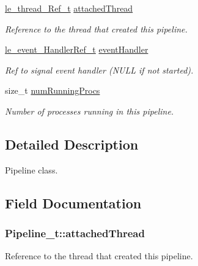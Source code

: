 \begin{DoxyCompactItemize}
\hyperlink{le__thread_8h_a32121104c6b4ca39008eb79a4d6862f2}{le\+\_\+thread\+\_\+\+Ref\+\_\+t} \hyperlink{struct_pipeline__t_a87fa47c4132391edce05712f2773c050}{attached\+Thread}
\begin{DoxyCompactList}\small\item\em Reference to the thread that created this pipeline. \end{DoxyCompactList}\item 
\hyperlink{le__event_loop_8h_ae7ab96b8e3441b3d484fcf52aa7a9dad}{le\+\_\+event\+\_\+\+Handler\+Ref\+\_\+t} \hyperlink{struct_pipeline__t_a10aa8c3db34c8afc9a8df8bafa27d43b}{event\+Handler}
\begin{DoxyCompactList}\small\item\em Ref to signal event handler (N\+U\+LL if not started). \end{DoxyCompactList}\item 
size\+\_\+t \hyperlink{struct_pipeline__t_a7e5d6b798e627db6db429ae3bc73cb91}{num\+Running\+Procs}
\begin{DoxyCompactList}\small\item\em Number of processes running in this pipeline. \end{DoxyCompactList}\end{DoxyCompactItemize}


\subsection{Detailed Description}
Pipeline class. 

\subsection{Field Documentation}
\subsubsection[{\texorpdfstring{attached\+Thread}{attachedThread}}]{ Pipeline\+\_\+t\+::attached\+Thread}\hypertarget{struct_pipeline__t_a87fa47c4132391edce05712f2773c050}{}\label{struct_pipeline__t_a87fa47c4132391edce05712f2773c050}


Reference to the thread that created this pipeline. 

